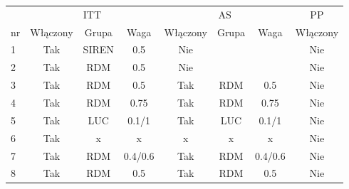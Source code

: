 \begin{tabular}{lccccccc}
 \toprule
 \multicolumn{1}{c}{ } & \multicolumn{3}{c}{ITT} & \multicolumn{3}{c}{AS}  & \multicolumn{1}{c}{PP} \\
 \cmidrule(r){2-4} \cmidrule(r){5-7} 
 nr & Włączony & Grupa & Waga & Włączony & Grupa & Waga & Włączony  \\
 1 & Tak & SIREN & 0.5 & Nie & \ & \ & Nie \\
 2 & Tak & RDM & 0.5 & Nie & \ & \ & Nie \\
 3 & Tak & RDM & 0.5 & Tak & RDM & 0.5 & Nie \\ 
 4 & Tak & RDM & 0.75 & Tak & RDM & 0.75 & Nie \\ 
 5 & Tak & LUC & 0.1/1 & Tak & LUC & 0.1/1 & Nie \\ 
 6 & Tak & x & x &  x & x & x & Nie \\
 7 & Tak & RDM & 0.4/0.6 & Tak & RDM & 0.4/0.6 & Nie \\ 
 8 & Tak & RDM & 0.5 & Tak & RDM & 0.5 & Nie \\ 
 
 \bottomrule
\end{tabular}